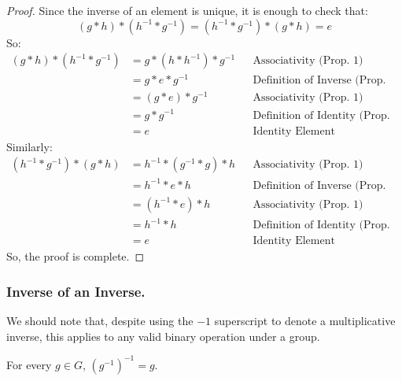 \documentclass[letterpaper]{article}
\begin{document}
\begin{mdframed}
    \begin{proof}
        Since the inverse of an element is unique, it is enough to check that: 
        \[(g * h) * (h^{-1} * g^{-1}) = (h^{-1} * g^{-1}) * (g * h) = e\]
        So: 
        \begin{equation*}
            \begin{aligned}
                (g * h) * (h^{-1} * g^{-1}) &= g * (h * h^{-1}) * g^{-1} && \text{Associativity (Prop. 1)} \\ 
                    &= g * e * g^{-1} && \text{Definition of Inverse (Prop. 3)} \\ 
                    &= (g * e) * g^{-1} && \text{Associativity (Prop. 1)} \\ 
                    &= g * g^{-1} && \text{Definition of Identity (Prop. 2)} \\ 
                    &= e && \text{Identity Element}
            \end{aligned}
        \end{equation*}
        Similarly: 
        \begin{equation*}
            \begin{aligned}
                (h^{-1} * g^{-1}) * (g * h) &= h^{-1} * (g^{-1} * g) * h && \text{Associativity (Prop. 1)} \\ 
                    &= h^{-1} * e * h && \text{Definition of Inverse (Prop. 3)} \\ 
                    &= (h^{-1} * e) * h && \text{Associativity (Prop. 1)} \\ 
                    &= h^{-1} * h && \text{Definition of Identity (Prop. 2)} \\ 
                    &= e && \text{Identity Element}
            \end{aligned}
        \end{equation*}
        So, the proof is complete. 
    \end{proof}
\end{mdframed}

\subsubsection{Inverse of an Inverse.}
We should note that, despite using the $-1$ superscript to denote a multiplicative inverse, this applies to any valid binary operation under a group. 

\begin{lemma}{}{}
    For every $g \in G$, $(g^{-1})^{-1} = g$. 
\end{lemma}
\end{document}
